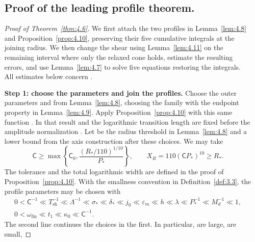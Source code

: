 \subsection{Proof of the leading profile theorem.}\label{sec:4.6}

\begin{proof}[Proof of Theorem~\ref{thm:4.6}]
We first attach the two profiles in Lemma~\ref{lem:4.8} and Proposition~\ref{prop:4.10},
preserving their five cumulative integrals at the joining radius. We then change the shear using
Lemma~\ref{lem:4.11} on the remaining interval where only the relaxed cone holds, estimate the
resulting errors, and use Lemma~\ref{lem:4.7} to solve five equations restoring the integrals. All
estimates below concern .

\noindent\textbf{Step 1: choose the parameters and join the profiles.}
Choose the outer parameters  and
 from Lemma~\ref{lem:4.8}, choosing the family with the endpoint
property in Lemma~\ref{lem:4.9}. Apply Proposition~\ref{prop:4.10} with this same function
. In that result  and the logarithmic
transition length  are fixed before the amplitude normalization
. Let  be the radius threshold in
 Lemma~\ref{lem:4.8} and  a lower bound from the axis construction after
these choices. We may take
\[
\mathsf C\ge\max\!\left\{\mathsf C_0,\frac{(R_*/110)^{1/10}}{P_*}\right\},
\qquad
X_R=110(\mathsf C P_*)^{10}\ge R_*.
\]
The tolerance  and the total logarithmic width
 are defined in the proof of
Proposition~\ref{prop:4.10}. With the smallness convention in Definition~\ref{def:3.3}, the
profile parameters may be chosen with
\begin{gather*}
0<\mathsf C^{-1}\ll T_{\mathrm{sh}}^{-1}\ll\Lambda^{-1}\ll\sigma_*\ll\delta_*\ll j_0
\ll\varepsilon_m\ll h\ll\lambda\ll P_*^{-1}\ll M_d^{-1}\ll1,\\
0<\omega_{\mathrm{fin}}\ll t_1\ll\kappa_0\ll \mathsf C^{-1}.
\end{gather*}
The second line continues the choices in the first. In particular,
 are large,
 are small,

\end{proof}
